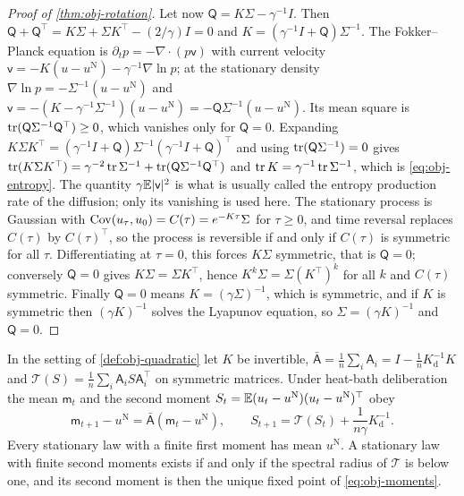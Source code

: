 \begin{proof}[Proof of \cref{thm:obj-rotation}]
Let now $\mathsf Q=K\Sigma-\gamma^{-1}I$. Then $\mathsf Q+\mathsf Q^\top=K\Sigma+\Sigma K^\top-(2/\gamma)I=0$ and $K=(\gamma^{-1}I+\mathsf Q)\Sigma^{-1}$. The Fokker--Planck equation is $\partial_tp=-\nabla\cdot(p\mathsf v)$ with current velocity $\mathsf v=-K(u-u^{\mathrm N})-\gamma^{-1}\nabla\ln p$; at the stationary density $\nabla\ln p=-\Sigma^{-1}(u-u^{\mathrm N})$ and $\mathsf v=-(K-\gamma^{-1}\Sigma^{-1})(u-u^{\mathrm N})=-\mathsf Q\Sigma^{-1}(u-u^{\mathrm N})$. Its mean square is $\operatorname{tr}(\mathsf Q\Sigma^{-1}\mathsf Q^\top)\ge0$, which vanishes only for $\mathsf Q=0$. Expanding $K\Sigma K^\top=(\gamma^{-1}I+\mathsf Q)\Sigma^{-1}(\gamma^{-1}I+\mathsf Q)^\top$ and using $\operatorname{tr}(\mathsf Q\Sigma^{-1})=0$ gives $\operatorname{tr}(K\Sigma K^\top)=\gamma^{-2}\operatorname{tr}\Sigma^{-1}+\operatorname{tr}(\mathsf Q\Sigma^{-1}\mathsf Q^\top)$ and $\operatorname{tr} K=\gamma^{-1}\operatorname{tr}\Sigma^{-1}$, which is \eqref{eq:obj-entropy}. The quantity $\gamma\mathbb{E}\lvert\mathsf v\rvert^2$ is what is usually called the entropy production rate of the diffusion; only its vanishing is used here. The stationary process is Gaussian with $\operatorname{Cov}(u_\tau,u_0)=C(\tau)=e^{-K\tau}\Sigma$ for $\tau\ge0$, and time reversal replaces $C(\tau)$ by $C(\tau)^\top$, so the process is reversible if and only if $C(\tau)$ is symmetric for all $\tau$. Differentiating at $\tau=0$, this forces $K\Sigma$ symmetric, that is $\mathsf Q=0$; conversely $\mathsf Q=0$ gives $K\Sigma=\Sigma K^\top$, hence $K^k\Sigma=\Sigma(K^\top)^k$ for all $k$ and $C(\tau)$ symmetric. Finally $\mathsf Q=0$ means $K=(\gamma\Sigma)^{-1}$, which is symmetric, and if $K$ is symmetric then $(\gamma K)^{-1}$ solves the Lyapunov equation, so $\Sigma=(\gamma K)^{-1}$ and $\mathsf Q=0$.
\end{proof}

\begin{lemma}\label{lem:obj-moments}
In the setting of \cref{def:obj-quadratic} let $K$ be invertible, $\bar{\mathsf A}=\frac1n\sum_i\mathsf A_i=I-\frac1nK_{\mathrm d}^{-1}K$ and $\mathcal T(S)=\frac1n\sum_i\mathsf A_iS\mathsf A_i^\top$ on symmetric matrices. Under heat-bath deliberation the mean $\mathsf m_t$ and the second moment $S_t=\mathbb{E}(u_t-u^{\mathrm N})(u_t-u^{\mathrm N})^\top$ obey
\begin{equation}\label{eq:obj-moments}
\mathsf m_{t+1}-u^{\mathrm N}=\bar{\mathsf A}(\mathsf m_t-u^{\mathrm N}),\qquad S_{t+1}=\mathcal T(S_t)+\frac1{n\gamma}K_{\mathrm d}^{-1}.
\end{equation}
Every stationary law with a finite first moment has mean $u^{\mathrm N}$. A stationary law with finite second moments exists if and only if the spectral radius of $\mathcal T$ is below one, and its second moment is then the unique fixed point of \eqref{eq:obj-moments}.
\end{lemma}

